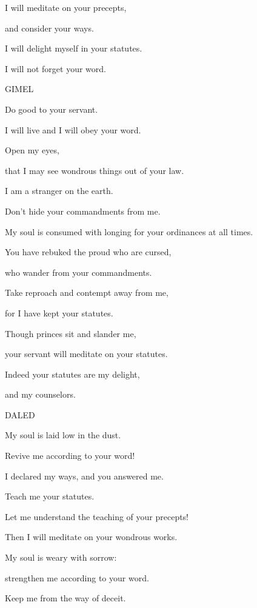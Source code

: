 {\par }{\Q {}I will meditate on your precepts,
\par }{\QB and consider your ways.
\par }{\Q {}I will delight myself in your statutes.
\par }{\QB I will not forget your word.
\par }{\D GIMEL
\par }{\Q {}Do good to your servant.
\par }{\QB I will live and I will obey your word.
\par }{\Q {}Open my eyes,
\par }{\QB that I may see wondrous things out of your law.
\par }{\Q {}I am a stranger on the earth.
\par }{\QB Don’t hide your commandments from me.
\par }{\Q {}My soul is consumed with longing for your ordinances at all times.
\par }{\Q {}You have rebuked the proud who are cursed,
\par }{\QB who wander from your commandments.
\par }{\Q {}Take reproach and contempt away from me,
\par }{\QB for I have kept your statutes.
\par }{\Q {}Though princes sit and slander me,
\par }{\QB your servant will meditate on your statutes.
\par }{\Q {}Indeed your statutes are my delight,
\par }{\QB and my counselors.
\par }{\D DALED
\par }{\Q {}My soul is laid low in the dust.
\par }{\QB Revive me according to your word!
\par }{\Q {}I declared my ways, and you answered me.
\par }{\QB Teach me your statutes.
\par }{\Q {}Let me understand the teaching of your precepts!
\par }{\QB Then I will meditate on your wondrous works.
\par }{\Q {}My soul is weary with sorrow:
\par }{\QB strengthen me according to your word.
\par }{\Q {}Keep me from the way of deceit.
}
